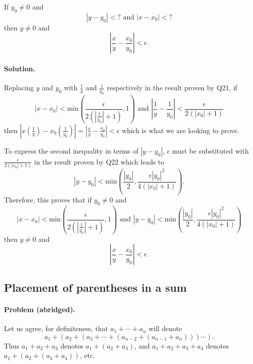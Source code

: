 \documentclass{article}
\begin{document}
If $y_0 \neq 0$ and \begin{equation*}
  |y - y_0| < ? \text{ and } |x - x_0| < ?
\end{equation*} then $y \neq 0$ and \begin{equation*}
  \left|\frac{x}{y} - \frac{x_0}{y_0}\right| < \epsilon.
\end{equation*}

\paragraph{Solution.} Replacing $y$ and $y_0$ with $\frac{1}{y}$ and
$\frac{1}{y_0}$ respectively in the result proven by Q21, if \begin{equation*}
  |x - x_0| < \mathrm{min}\left(\frac{\epsilon}{2(|\frac{1}{y_0}| + 1)},
  1\right) \text{ and } \left|\frac{1}{y} - \frac{1}{y_0}\right| <
  \frac{\epsilon}{2(|x_0| + 1)}
\end{equation*} then $|x(\frac{1}{y}) - x_0(\frac{1}{y_0})| = \left|\frac{x}{y}
- \frac{x_0}{y_0}\right| < \epsilon$ which is what we are looking to prove.

To express the second inequality in terms of $|y - y_0|$, $\epsilon$ must be
substituted with $\frac{\epsilon}{2(|x_0| + 1)}$ in the result proven by Q22
which leads to \begin{equation*}
  |y - y_0| < \mathrm{min}\left(\frac{|y_0|}{2},
  \frac{\epsilon|y_0|^2}{4(|x_0| + 1)}\right).
\end{equation*}
Therefore, this proves that if $y_0 \neq 0$ and \begin{equation*}
  |x - x_0| < \mathrm{min}\left(\frac{\epsilon}{2(|\frac{1}{y_0}| + 1)},
  1\right) \text{ and } |y - y_0| < \mathrm{min}\left(\frac{|y_0|}{2},
  \frac{\epsilon|y_0|^2}{4(|x_0| + 1)}\right)
\end{equation*} then $y \neq 0$ and \begin{equation*}
  \left|\frac{x}{y} - \frac{x_0}{y_0}\right| < \epsilon.
\end{equation*}

\setcounter{subsection}{23}
\subsection{Placement of parentheses in a sum}

\paragraph{Problem (abridged).} Let us agree, for definiteness, that $a_1 +
\cdots + a_n$ will denote \begin{equation*}
  a_1 + (a_2 + (a_3 + \cdots + (a_{n-2} + (a_{n-1} + a_n)))\cdots).
\end{equation*}
Thus $a_1 + a_2 + a_3$ denotes $a_1 + (a_2 + a_3)$, and $a_1 + a_2 + a_3 + a_4$
denotes $a_1 + (a_2 + (a_3 + a_4))$, etc.
\end{document}
